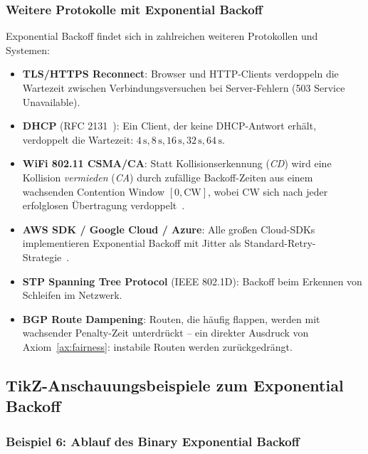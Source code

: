﻿\documentclass[a4paper,12pt]{article}
\theoremstyle{definition}
\begin{document}
\subsubsection{Weitere Protokolle mit Exponential Backoff}

Exponential Backoff findet sich in zahlreichen weiteren Protokollen
und Systemen:

\begin{itemize}
  \item \textbf{TLS/HTTPS Reconnect}: Browser und HTTP-Clients verdoppeln
        die Wartezeit zwischen Verbindungsversuchen bei Server-Fehlern
        (503 Service Unavailable).
  \item \textbf{DHCP} (RFC 2131~\cite{rfc2131}): Ein Client, der keine
        DHCP-Antwort erhält, verdoppelt die Wartezeit:
        $4\,\mathrm{s}, 8\,\mathrm{s}, 16\,\mathrm{s}, 32\,\mathrm{s},
        64\,\mathrm{s}$.
  \item \textbf{WiFi 802.11 CSMA/CA}: Statt Kollisionserkennung
        (\emph{CD}) wird eine Kollision \emph{vermieden} (\emph{CA})
        durch zufällige Backoff-Zeiten aus einem wachsenden Contention
        Window $[0, \mathrm{CW}]$, wobei $\mathrm{CW}$ sich nach
        jeder erfolglosen Übertragung verdoppelt~\cite{ieee80211}.
  \item \textbf{AWS SDK / Google Cloud / Azure}: Alle großen Cloud-SDKs
        implementieren Exponential Backoff mit Jitter als Standard-Retry-
        Strategie~\cite{amazon2022backoff}.
  \item \textbf{STP Spanning Tree Protocol} (IEEE 802.1D): Backoff beim
        Erkennen von Schleifen im Netzwerk.
  \item \textbf{BGP Route Dampening}: Routen, die häufig
        flappen, werden mit wachsender Penalty-Zeit unterdrückt -- ein
        direkter Ausdruck von Axiom~\ref{ax:fairness}: instabile Routen
        werden zurückgedrängt.
\end{itemize}

\subsection{TikZ-Anschauungsbeispiele zum Exponential Backoff}

\subsubsection{Beispiel 6: Ablauf des Binary Exponential Backoff}
\end{document}
